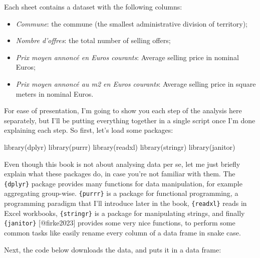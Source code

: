 \documentclass[
  letterpaper,
  DIV=11,
  numbers=noendperiod]{scrartcl}
\newenvironment{Shaded}{\begin{snugshade}}{\end{snugshade}}
\newcommand{\FunctionTok}[1]{\textcolor[rgb]{0.28,0.35,0.67}{#1}}
\newcommand{\NormalTok}[1]{\textcolor[rgb]{0.00,0.23,0.31}{#1}}
\providecommand{\tightlist}{%
  \setlength{\itemsep}{0pt}\setlength{\parskip}{0pt}}\usepackage{longtable,booktabs,array}
\begin{document}
Each sheet contains a dataset with the following columns:

\begin{itemize}
\tightlist
\item
  \emph{Commune}: the commune (the smallest administrative division of
  territory);
\item
  \emph{Nombre d'offres}: the total number of selling offers;
\item
  \emph{Prix moyen annoncé en Euros courants}: Average selling price in
  nominal Euros;
\item
  \emph{Prix moyen annoncé au m2 en Euros courants}: Average selling
  price in square meters in nominal Euros.
\end{itemize}

For ease of presentation, I'm going to show you each step of the
analysis here separately, but I'll be putting everything together in a
single script once I'm done explaining each step. So first, let's load
some packages:

\begin{Shaded}
\begin{Highlighting}[]
\FunctionTok{library}\NormalTok{(dplyr)}
\FunctionTok{library}\NormalTok{(purrr)}
\FunctionTok{library}\NormalTok{(readxl)}
\FunctionTok{library}\NormalTok{(stringr)}
\FunctionTok{library}\NormalTok{(janitor)}
\end{Highlighting}
\end{Shaded}

Even though this book is not about analysing data per se, let me just
briefly explain what these packages do, in case you're not familiar with
them. The \texttt{\{dplyr\}} package provides many functions for data
manipulation, for example aggregating group-wise. \texttt{\{purrr\}} is
a package for functional programming, a programming paradigm that I'll
introduce later in the book, \texttt{\{readxl\}} reads in Excel
workbooks, \texttt{\{stringr\}} is a package for manipulating strings,
and finally \texttt{\{janitor\}} {[}@firke2023{]} provides some very
nice functions, to perform some common tasks like easily rename every
column of a data frame in snake case.

Next, the code below downloads the data, and puts it in a data frame:
\end{document}
